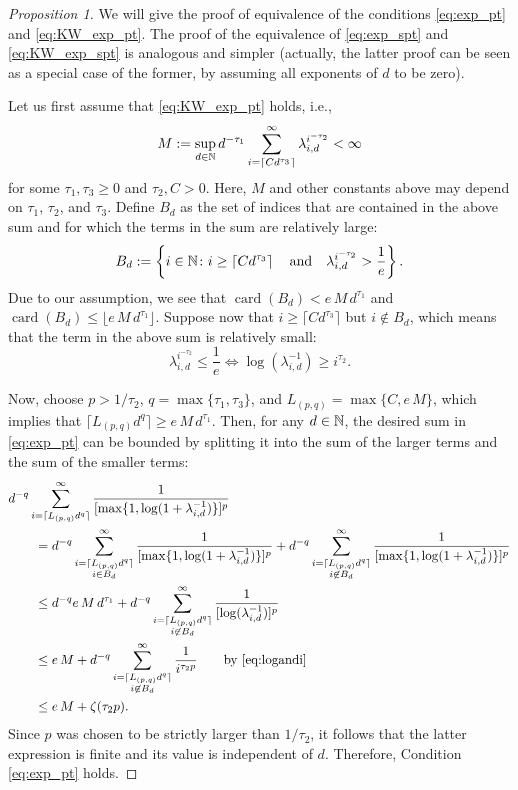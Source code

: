 \documentclass[sort&compress]{elsarticle}
\DeclareMathOperator{\card}{card}
\begin{document}
\begin{proof}[Proposition 1]
We will give the proof of equivalence of the conditions \eqref{eq:exp_pt} and \eqref{eq:KW_exp_pt}. The proof of the equivalence of \eqref{eq:exp_spt} and \eqref{eq:KW_exp_spt} is analogous and simpler (actually, the latter proof can be seen as a special case of the former, by assuming all exponents of $d$ to be zero).

Let us first assume that \eqref{eq:KW_exp_pt} holds, i.e.,
\[
M:=\sup_{d\in\mathbb{N}} d^{-\tau_1} \sum_{i=\lceil C d^{\tau_3} \rceil}^{\infty} \lambda_{i,d}^{i^{-\tau_2}} < \infty
\]
for some $\tau_1,\tau_3\ge 0$ and $\tau_2, C>0$. Here, $M$ and other constants above may depend on $\tau_1$, $\tau_2$, and $\tau_3$.
Define $B_d$ as the set of indices that are contained in the above sum and for which the terms in the sum are relatively large:
\[
B_d:=\left\{i\in\mathbb{N} \colon i\ge \left\lceil Cd^{\tau_3}\right\rceil\quad\mbox{and}\quad
\lambda_{i,d}^{i^{-\tau_2}}>\frac{1}{e}\right\}.
\]
Due to our assumption, we see that $\card(B_d) < e\,M\,d^{\tau_1}$ and $\card(B_d)\le \lfloor e\,M\,d^{\tau_1} \rfloor$. 
Suppose now that $i\ge \lceil C d^{\tau_3}\rceil$ but $i\not\in B_d$, which means that the term in the above sum is relatively small:
\begin{equation}
    \lambda_{i,d}^{i^{-\tau_2}} \le \frac{1}{e} \iff \log (\lambda_{i,d}^{-1})\ge i^{\tau_2}.
\label{eq:logandi}
\end{equation}

Now, choose $p> 1/\tau_2$, $q=\max\{\tau_1,\tau_3\}$, and $L_{(p,q)}=\max\{C, e\, M\}$, which implies that $\lceil L_{(p,q)} d^{q}\rceil \ge e\, M\, d^{\tau_1}$. Then, for any $d\in\mathbb{N}$, the desired sum in \eqref{eq:exp_pt} can be bounded by splitting it into the sum of the larger terms and the sum of the smaller terms:
\begin{align*}
\MoveEqLeft{d^{-q} \sum_{i=\lceil L_{(p,q)} d^{q}\rceil}^\infty \frac{1}{[\max\{1,\log(1+\lambda_{i,d}^{-1})\}]^p}} \\
&=d^{-q} \sum_{\substack{i=\lceil L_{(p,q)} d^{q}\rceil\\ i\in B_d}}^\infty \frac{1}{[\max\{1,\log(1+\lambda_{i,d}^{-1})\}]^p} + d^{-q} \sum_{\substack{i=\lceil L_{(p,q)} d^{q}\rceil\\ i\not\in B_d}}^\infty \frac{1}{[\max\{1,\log(1+\lambda_{i,d}^{-1})\}]^p}\\
&\le d^{-q} e\, M\, d^{\tau_1} + d^{-q}\sum_{\substack{i=\lceil L_{(p,q)} d^{q}\rceil\\ i\not\in B_d}}^\infty \frac{1}{[\log (\lambda_{i,d}^{-1})]^p}\\
&\le e\, M + d^{-q}\sum_{\substack{i=\lceil L_{(p,q)} d^{q}\rceil\\ i\not\in B_d}}^\infty \frac{1}{i^{\tau_2 p}} \qquad \text{by \eqref{eq:logandi}}\\
&\le  e\, M + \zeta (\tau_2 p).
\end{align*}
Since $p$ was chosen to be strictly larger than $1/\tau_2$, it follows that the latter expression is finite and its value is independent of $d$. Therefore, Condition \eqref{eq:exp_pt} holds.


\end{proof}
\end{document}
